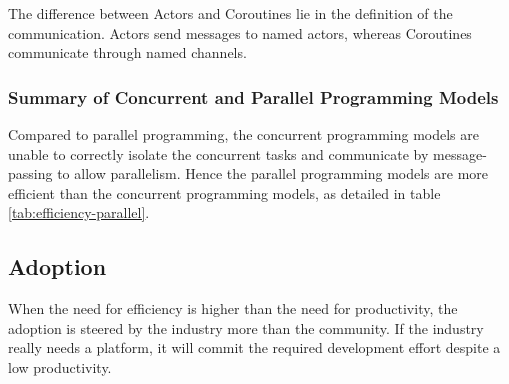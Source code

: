The difference between Actors and Coroutines lie in the definition of the communication.
Actors send messages to named actors, whereas Coroutines communicate through named channels.

\subsubsection{Summary of Concurrent and Parallel Programming Models}

Compared to parallel programming, the concurrent programming models are unable to correctly isolate the concurrent tasks and communicate by message-passing to allow parallelism.
Hence the parallel programming models are more efficient than the concurrent programming models, as detailed in table \ref{tab:efficiency-parallel}.


\subsection{Adoption} \label{chapter3:software-efficiency:adoption}

\begin{figure}[h!]
%
\end{figure}

When the need for efficiency is higher than the need for productivity, the adoption is steered by the industry more than the community.
If the industry really needs a platform, it will commit the required development effort despite a low productivity.


